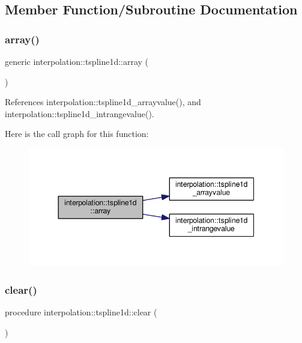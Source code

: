 \subsection{Member Function/\+Subroutine Documentation}
\mbox{\label{structinterpolation_1_1tspline1d_a58749b0ffdd7921d7102e4a5da1808c4}} 
\subsubsection{\texorpdfstring{array()}{array()}}
{\footnotesize\ttfamily generic interpolation\+::tspline1d\+::array (\begin{DoxyParamCaption}{ }\end{DoxyParamCaption})}



References interpolation\+::tspline1d\+\_\+arrayvalue(), and interpolation\+::tspline1d\+\_\+intrangevalue().

Here is the call graph for this function\+:
\nopagebreak
\begin{figure}[H]
\begin{center}
\leavevmode
\includegraphics[width=344pt]{structinterpolation_1_1tspline1d_a58749b0ffdd7921d7102e4a5da1808c4_cgraph}
\end{center}
\end{figure}
\mbox{\label{structinterpolation_1_1tspline1d_a28c8ad7c5387f36a20181f39555b9416}} 
\subsubsection{\texorpdfstring{clear()}{clear()}}
{\footnotesize\ttfamily procedure interpolation\+::tspline1d\+::clear (\begin{DoxyParamCaption}{ }\end{DoxyParamCaption})}

